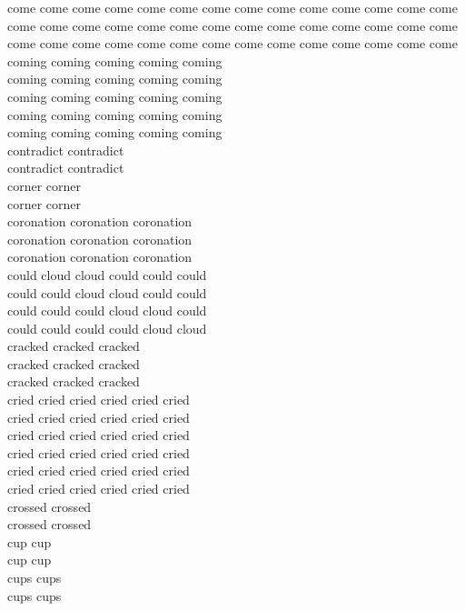 come come come come come come come come come come come come come come\\
come come come come come come come come come come come come come come\\
come come come come come come come come come come come come come come\\
coming coming coming coming coming\\
coming coming coming coming coming\\
coming coming coming coming coming\\
coming coming coming coming coming\\
coming coming coming coming coming\\
contradict contradict\\
contradict contradict\\
corner corner\\
corner corner\\
coronation coronation coronation\\
coronation coronation coronation\\
coronation coronation coronation\\
could cloud cloud could could could\\
could could cloud cloud could could\\
could could could cloud cloud could\\
could could could could cloud cloud\\
cracked cracked cracked\\
cracked cracked cracked\\
cracked cracked cracked\\
cried cried cried cried cried cried\\
cried cried cried cried cried cried\\
cried cried cried cried cried cried\\
cried cried cried cried cried cried\\
cried cried cried cried cried cried\\
cried cried cried cried cried cried\\
crossed crossed\\
crossed crossed\\
cup cup\\
cup cup\\
cups cups\\
cups cups\\


